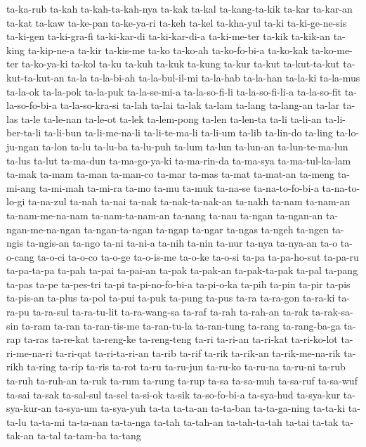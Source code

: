{ta-ka-rub ta-kah ta-kah-ta-kah-nya ta-kak ta-kal ta-kang-ta-kik ta-kar
ta-kar-an ta-kat ta-kaw ta-ke-pan ta-ke-ya-ri ta-keh ta-kel ta-kha-yul
ta-ki ta-ki-ge-ne-sis ta-ki-gen ta-ki-gra-fi ta-ki-kar-di ta-ki-kar-di-a
ta-ki-me-ter ta-kik ta-kik-an ta-king ta-kip-ne-a ta-kir ta-kis-me ta-ko
ta-ko-ah ta-ko-fo-bi-a ta-ko-kak ta-ko-me-ter ta-ko-ya-ki ta-kol ta-ku
ta-kuh ta-kuk ta-kung ta-kur ta-kut ta-kut-ta-kut ta-kut-ta-kut-an ta-la
ta-la-bi-ah ta-la-bul-il-mi ta-la-hab ta-la-han ta-la-ki ta-la-mus
ta-la-ok ta-la-pok ta-la-puk ta-la-se-mi-a ta-la-so-fi-li ta-la-so-fi-li-a
ta-la-so-fit ta-la-so-fo-bi-a ta-la-so-kra-si ta-lah ta-lai ta-lak ta-lam
ta-lang ta-lang-an ta-lar ta-las ta-le ta-le-nan ta-le-ot ta-lek
ta-lem-pong ta-len ta-len-ta ta-li ta-li-an ta-li-ber-ta-li ta-li-bun
ta-li-me-na-li ta-li-te-ma-li ta-li-um ta-lib ta-lin-do ta-ling
ta-lo-ju-ngan ta-lon ta-lu ta-lu-ba ta-lu-puh ta-lum ta-lun ta-lun-an
ta-lun-te-ma-lun ta-lus ta-lut ta-ma-dun ta-ma-go-ya-ki ta-ma-rin-da
ta-ma-sya ta-ma-tul-ka-lam ta-mak ta-mam ta-man ta-man-co ta-mar ta-mas
ta-mat ta-mat-an ta-meng ta-mi-ang ta-mi-mah ta-mi-ra ta-mo ta-mu ta-muk
ta-na-se ta-na-to-fo-bi-a ta-na-to-lo-gi ta-na-zul ta-nah ta-nai ta-nak
ta-nak-ta-nak-an ta-nakh ta-nam ta-nam-an ta-nam-me-na-nam
ta-nam-ta-nam-an ta-nang ta-nau ta-ngan ta-ngan-an ta-ngan-me-na-ngan
ta-ngan-ta-ngan ta-ngap ta-ngar ta-ngas ta-ngeh ta-ngen ta-ngis ta-ngis-an
ta-ngo ta-ni ta-ni-a ta-nih ta-nin ta-nur ta-nya ta-nya-an ta-o ta-o-cang
ta-o-ci ta-o-co ta-o-ge ta-o-is-me ta-o-ke ta-o-si ta-pa ta-pa-ho-sut
ta-pa-ru ta-pa-ta-pa ta-pah ta-pai ta-pai-an ta-pak ta-pak-an
ta-pak-ta-pak ta-pal ta-pang ta-pas ta-pe ta-pes-tri ta-pi
ta-pi-no-fo-bi-a ta-pi-o-ka ta-pih ta-pin ta-pir ta-pis ta-pis-an ta-plus
ta-pol ta-pui ta-puk ta-pung ta-pus ta-ra ta-ra-gon ta-ra-ki ta-ra-pu
ta-ra-sul ta-ra-tu-lit ta-ra-wang-sa ta-raf ta-rah ta-rah-an ta-rak
ta-rak-sa-sin ta-ram ta-ran ta-ran-tis-me ta-ran-tu-la ta-ran-tung ta-rang
ta-rang-ba-ga ta-rap ta-ras ta-re-kat ta-reng-ke ta-reng-teng ta-ri
ta-ri-an ta-ri-kat ta-ri-ko-lot ta-ri-me-na-ri ta-ri-qat ta-ri-ta-ri-an
ta-rib ta-rif ta-rik ta-rik-an ta-rik-me-na-rik ta-rikh ta-ring ta-rip
ta-ris ta-rot ta-ru ta-ru-jun ta-ru-ko ta-ru-na ta-ru-ni ta-rub ta-ruh
ta-ruh-an ta-ruk ta-rum ta-rung ta-rup ta-sa ta-sa-muh ta-sa-ruf ta-sa-wuf
ta-sai ta-sak ta-sal-sul ta-sel ta-si-ok ta-sik ta-so-fo-bi-a ta-sya-hud
ta-sya-kur ta-sya-kur-an ta-sya-um ta-sya-yuh ta-ta ta-ta-an ta-ta-ban
ta-ta-ga-ning ta-ta-ki ta-ta-lu ta-ta-mi ta-ta-nan ta-ta-nga ta-tah
ta-tah-an ta-tah-ta-tah ta-tai ta-tak ta-tak-an ta-tal ta-tam-ba ta-tang
}
